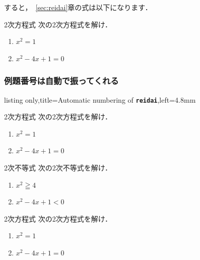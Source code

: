 \documentclass[../geometrymemo.tex]{subfiles}
\begin{document}
すると，~\ref{sec:reidai}章の式は以下になります．
\begin{reidai2}{2次方程式}{}
    次の2次方程式を解け．\vspace{-8pt}
    \begin{enumerate}[(1)\;]
        \item \(x^2=1\)
        \item \(x^2-4x+1=0\)
    \end{enumerate}
\end{reidai2}

\subsubsection{例題番号は自動で振ってくれる}

\begin{tcblisting}{listing only,title=Automatic numbering of \textbf{\texttt{reidai}},left=4.8mm}
    \begin{reidai2}{2次方程式}{}
        次の2次方程式を解け．\vspace{-8pt}
        \begin{enumerate}[(1)\;]
            \item \(x^2=1\)
            \item \(x^2-4x+1=0\)
        \end{enumerate}
    \end{reidai2}

    \vspace{\baselineskip}

    \begin{reidai2}{2次不等式}{}
        次の2次不等式を解け．\vspace{-8pt}
        \begin{enumerate}[(1)\;]
            \item \(x^2 \geqq 4\)
            \item \(x^2-4x+1 < 0\)
        \end{enumerate}
    \end{reidai2}
\end{tcblisting}

\begin{reidai2}{2次方程式}{}
    次の2次方程式を解け．\vspace{-8pt}
    \begin{enumerate}[(1)\;]
        \item \(x^2=1\)
        \item \(x^2-4x+1=0\)
    \end{enumerate}
\end{reidai2}
\end{document}
